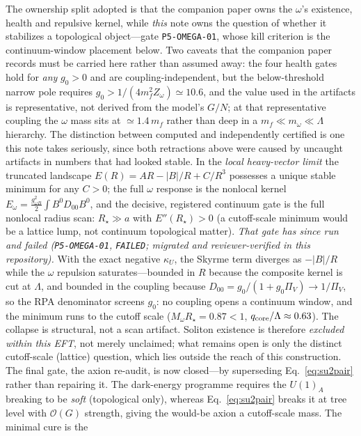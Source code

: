 \documentclass[11pt,a4paper]{article}
\begin{document}
The ownership split adopted is that the companion paper owns the
$\omega$'s existence, health and repulsive kernel, while
\emph{this} note owns the question of whether it stabilizes a
topological object---gate \texttt{P5-OMEGA-01}, whose kill
criterion is the continuum-window placement below.
Two caveats that the companion paper records must be carried here
rather than assumed away: the four health gates hold for
\emph{any} $g_0 > 0$ and are coupling-independent, but the
below-threshold narrow pole requires
$g_0 > 1/(4m_f^2 Z_\omega) \simeq 10.6$, and the value used in
the artifacts is representative, not derived from the model's
$G/N$; at that representative coupling the $\omega$ mass sits at
$\simeq 1.4\,m_f$ rather than deep in a $m_f \ll m_\omega \ll
\Lambda$ hierarchy.  The distinction between computed and
independently certified is one this note takes seriously, since
both retractions above were caused by uncaught artifacts in
numbers that had looked stable.  In the \emph{local heavy-vector limit} the truncated landscape
$E(R) = AR - |B|/R + C/R^3$ possesses a unique stable minimum for
any $C > 0$; the full $\omega$ response is the nonlocal kernel
$E_\omega = \tfrac{g_{\omega B}^2}{2}\int B^0 D_{00} B^0$, and the
decisive, registered continuum gate is the full nonlocal radius
scan: $R_\star \gg a$ with $E''(R_\star) > 0$ (a cutoff-scale
minimum would be a lattice lump, not continuum topological
matter).  \emph{That gate has since run and failed
(\texttt{P5-OMEGA-01}, \texttt{FAILED}; migrated and reviewer-verified
in this repository).}  With the exact negative $\kappa_U$, the
Skyrme term diverges as $-|B|/R$ while the $\omega$ repulsion
saturates---bounded in $R$ because the composite kernel is cut at
$\Lambda$, and bounded in the coupling because
$D_{00} = g_0/(1 + g_0\Pi_V) \to 1/\Pi_V$, so the RPA denominator
screens $g_0$: no coupling opens a continuum window, and the
minimum runs to the cutoff scale ($M_\omega R_\star = 0.87 < 1$,
$q_{\rm core}/\Lambda \approx 0.63$).  The collapse is structural,
not a scan artifact.  Soliton existence is therefore \emph{excluded
within this EFT}, not merely unclaimed; what remains open is only
the distinct cutoff-scale (lattice) question, which lies outside
the reach of this construction.
The final gate, the axion re-audit, is now closed---by
superseding Eq.~\eqref{eq:su2pair} rather than repairing it.
The dark-energy programme requires the $U(1)_A$ breaking to be
\emph{soft} (topological only), whereas Eq.~\eqref{eq:su2pair}
breaks it at tree level with $\mathcal{O}(G)$ strength, giving
the would-be axion a cutoff-scale mass.  The minimal cure is the
\end{document}

